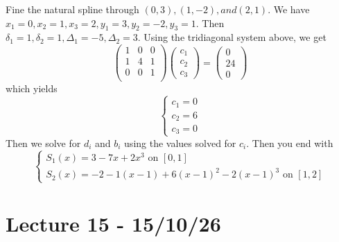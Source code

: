 \documentclass[11pt]{article}
\begin{document}
\begin{example}
    Fine the natural spline through $(0,3), (1,-2), and (2,1)$. We have $x_1 = 0, x_2 = 1, x_3 = 2, y_1 = 3, y_2 = -2, y_3 = 1$.
    Then $\delta_1 = 1, \delta_2 = 1, \Delta_1 = -5, \Delta_2 = 3$. Using the tridiagonal system above, we get
    \[
        \begin{pmatrix}
            1 & 0 & 0\\
            1 & 4 & 1 \\
            0 & 0 & 1 \\
        \end{pmatrix}
        \begin{pmatrix}
            c_1\\
            c_2\\
            c_3
        \end{pmatrix}
        =
        \begin{pmatrix}
            0\\24\\0
        \end{pmatrix}
    \]
    which yields
    \[
        \begin{cases}
            c_1 = 0 \\
            c_2 = 6\\
            c_3 = 0 
        \end{cases}
    \]
    Then we solve for $d_i$ and $b_i$ using the values solved for $c_i$. Then you end with
    \[
        \begin{cases}
            S_1(x) = 3-7x+2x^3 \text{ on } [0,1] \\
            S_2(x) = -2-1(x-1)+6(x-1)^2-2(x-1)^3\text{ on } [1,2] 
        \end{cases}
    \]
    
\end{example}

\section{Lecture 15 - 15/10/26}
\end{document}
